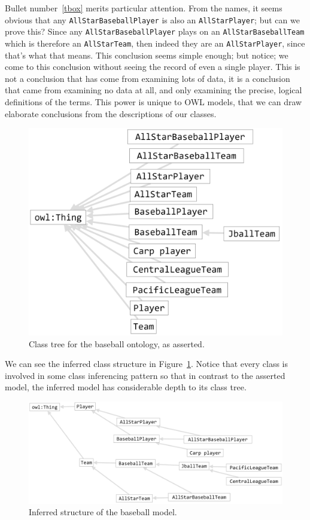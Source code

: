 Bullet number~\ref{tbox} merits particular attention.  From the names, it seems obvious that any 
\texttt{AllStarBaseballPlayer} is also  an  \texttt{AllStarPlayer}; but can we prove this?  
Since any \texttt{AllStarBaseballPlayer} plays on an \texttt{AllStarBaseballTeam} which is 
therefore an \texttt{AllStarTeam}, then indeed they are an \texttt{AllStarPlayer}, since
that's what that means.  This conclusion seems simple enough; but notice; we come to this conclusion
without seeing the record of even a single player.  This is not a conclusion that has come from 
examining lots of data, it is a conclusion that came from examining no data at all, and only 
examining the precise, logical definitions of the terms.  This power is unique to OWL models, 
that we can draw elaborate conclusions from the descriptions of our classes. 




\begin{figure}
\centering
\includegraphics[width=5in]{SWWOv3/media/ch13/figure13-9.png}
\caption{Class tree for the baseball ontology, as asserted.}
\label{fig:ch13.09}
\end{figure}



We can see the inferred class structure in Figure~\ref{fig:ch13.09}. Notice that
every class is involved in some class inferencing pattern so that in
contrast to the asserted model, the inferred model has considerable
depth to its class tree.

\begin{figure}
\centering
\includegraphics[width=5in]{SWWOv3/media/ch13/figure13-10.png}
\caption{Inferred structure of the baseball model.}
\label{fig:ch13.10}
\end{figure}

